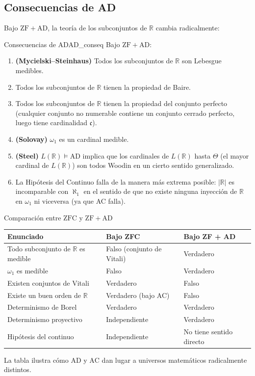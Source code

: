 \subsection{Consecuencias de AD}

Bajo $\mathrm{ZF} + \mathrm{AD}$, la teoría de los subconjuntos de $\mathbb{R}$ cambia radicalmente:

\begin{teorema}{Consecuencias de AD}{AD_conseq}
Bajo $\mathrm{ZF} + \mathrm{AD}$:
\begin{enumerate}[leftmargin=2em, label=(\roman*)]
  \item \textbf{(Mycielski--Steinhaus)} Todos los subconjuntos de $\mathbb{R}$ son Lebesgue medibles.
  \item Todos los subconjuntos de $\mathbb{R}$ tienen la propiedad de Baire.
  \item Todos los subconjuntos de $\mathbb{R}$ tienen la propiedad del conjunto perfecto (cualquier conjunto no numerable contiene un conjunto cerrado perfecto, luego tiene cardinalidad $\mathfrak{c}$).
  \item \textbf{(Solovay)} $\omega_1$ es un cardinal medible.
  \item \textbf{(Steel)} $L(\mathbb{R}) \models \mathrm{AD}$ implica que los cardinales de $L(\mathbb{R})$ hasta $\Theta$ (el mayor cardinal de $L(\mathbb{R})$) son todos Woodin en un cierto sentido generalizado.
  \item La Hipótesis del Continuo falla de la manera más extrema posible: $|\mathbb{R}|$ es incomparable con $\aleph_1$ en el sentido de que no existe ninguna inyección de $\mathbb{R}$ en $\omega_1$ ni viceversa (ya que AC falla).
\end{enumerate}
\end{teorema}

\begin{ejemplo}{Comparación entre $\mathrm{ZFC}$ y $\mathrm{ZF} + \mathrm{AD}$}{}
\begin{center}
\begin{tabular}{lll}
\hline
\textbf{Enunciado} & \textbf{Bajo ZFC} & \textbf{Bajo ZF + AD} \\
\hline
Todo subconjunto de $\mathbb{R}$ es medible & Falso (conjunto de Vitali) & Verdadero \\
$\omega_1$ es medible & Falso & Verdadero \\
Existen conjuntos de Vitali & Verdadero & Falso \\
Existe un buen orden de $\mathbb{R}$ & Verdadero (bajo AC) & Falso \\
Determinismo de Borel & Verdadero & Verdadero \\
Determinismo proyectivo & Independiente & Verdadero \\
Hipótesis del continuo & Independiente & No tiene sentido directo \\
\hline
\end{tabular}
\end{center}
La tabla ilustra cómo $\mathrm{AD}$ y $\mathrm{AC}$ dan lugar a universos matemáticos radicalmente distintos.
\end{ejemplo}

